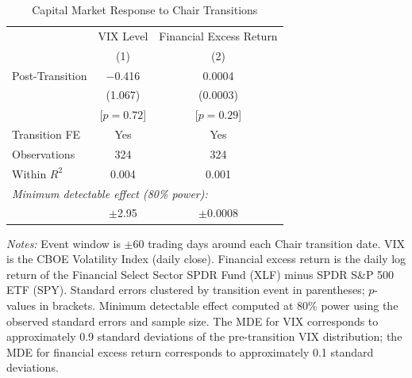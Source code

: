 \begin{table}[t]
\centering
\caption{Capital Market Response to Chair Transitions}
\label{tab:market_response}
\small
\begin{tabular}{lcc}
\toprule
 & VIX Level & Financial Excess Return \\
 & (1) & (2) \\
\midrule
Post-Transition & $-$0.416 & 0.0004 \\
 & (1.067) & (0.0003) \\
 & [$p = 0.72$] & [$p = 0.29$] \\
\midrule
Transition FE & Yes & Yes \\
Observations & 324 & 324 \\
Within $R^2$ & 0.004 & 0.001 \\
\midrule
\multicolumn{3}{l}{\textit{Minimum detectable effect (80\% power):}} \\
 & $\pm$2.95 & $\pm$0.0008 \\
\bottomrule
\end{tabular}
\begin{tablenotes}
\item \textit{Notes:} Event window is $\pm$60 trading days around each Chair transition date. VIX is the CBOE Volatility Index (daily close). Financial excess return is the daily log return of the Financial Select Sector SPDR Fund (XLF) minus SPDR S\&P 500 ETF (SPY). Standard errors clustered by transition event in parentheses; $p$-values in brackets. Minimum detectable effect computed at 80\% power using the observed standard errors and sample size. The MDE for VIX corresponds to approximately 0.9 standard deviations of the pre-transition VIX distribution; the MDE for financial excess return corresponds to approximately 0.1 standard deviations.
\end{tablenotes}
\end{table}
